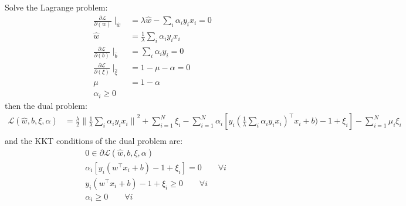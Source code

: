 \documentclass[a4paper]{article}
\begin{document}
Solve the Lagrange problem:
\begin{equation}
    \begin{aligned}
        \frac{\partial \mathcal{L}}{\partial(w)}\mid_{\hat{w}} &= \lambda \hat{w} - \sum_{i} \alpha_i y_i x_i = 0\\
        \hat{w} &= \frac{1}{\lambda} \sum_{i} \alpha_i y_i x_i \\
        \frac{\partial \mathcal{L}}{\partial(b)}\mid_{\hat{b}} &= \sum_{i} \alpha_i y_i = 0 \\
        \frac{\partial \mathcal{L}}{\partial(\xi)}\mid_{\hat{\xi}} &= 1 - \mu - \alpha= 0 \\
        \mu & = 1- \alpha \\
        \alpha_i \ge 0
    \end{aligned}
\end{equation}
then the dual problem:
\begin{equation}
    \begin{aligned}
        \mathcal{L}(\hat{w},b,\xi,\alpha)  &= \frac{\lambda}{2}{\| \frac{1}{\lambda} \sum_{i} \alpha_i y_i x_i \|}^2 + \sum_{i=1}^{N} \xi_i - \sum_{i=1}^{N} \alpha_i [y_i (\frac{1}{\lambda} \sum_{i} \alpha_i y_i x_i )^{\top} x_i + b) - 1+\xi_i] - \sum_{i=1}^{N} \mu_i \xi_i \\
    \end{aligned}
\end{equation}
and the KKT conditions of the dual problem are:
\begin{equation}
    \begin{aligned}
        & 0 \in \partial \mathcal{L}(\hat{w},b,\xi,\alpha) \\
        &\alpha_i [y_i(w^{\top} x_i + b) - 1+\xi_i] =0 \qquad \forall i \\
        & y_i(w^{\top} x_i + b) - 1+\xi_i \ge 0 \qquad \forall i\\
        & \alpha_i \ge 0 \qquad \forall i\\
    \end{aligned}
\end{equation}
\end{document}
